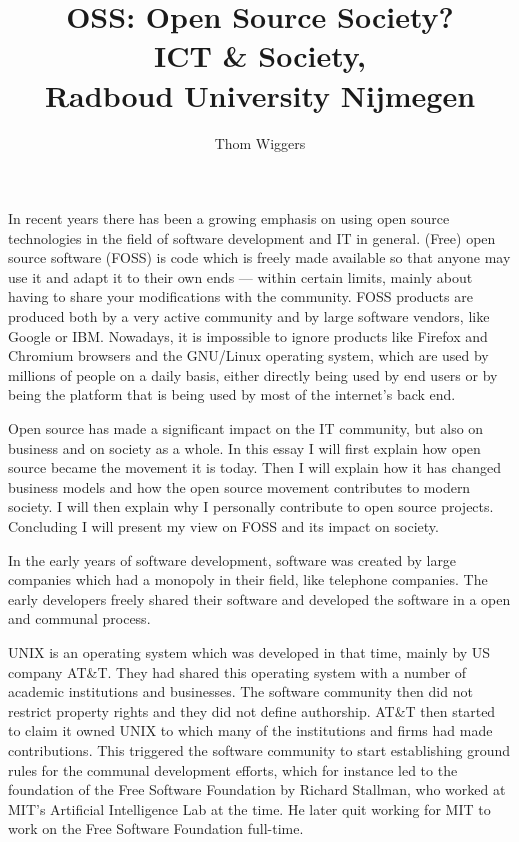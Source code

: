 \documentclass{article}
\author{Thom Wiggers}
\title{\Huge OSS: Open Source Society? \\ \Large ICT \& Society,\\ \large Radboud University Nijmegen}
\begin{document}
\maketitle

In recent years there has been a growing emphasis on using open source
technologies in the field of software development and IT in general. (Free)
open source software (FOSS) is code which is freely made available so that
anyone may use it and adapt it to their own ends --- within certain limits,
mainly about having to share your modifications with the community. FOSS
products are produced both by a very active community and by large software
vendors, like Google or IBM. Nowadays, it is impossible to ignore products like
Firefox and Chromium browsers and the GNU/Linux operating system, which are
used by millions of people on a daily basis, either directly being used by end
users or by being the platform that is being used by most of the internet's
back end.

Open source has made a significant impact on the IT community, but also on
business and on society as a whole. In this essay I will first explain how open
source became the movement it is today. Then I will explain how it has changed
business models and how the open source movement contributes to modern society.
I will then explain why I personally contribute to open source projects. Concluding
I will present my view on FOSS and its impact on society.

In the early years of software development, software was created by large
companies which had a monopoly in their field, like telephone companies. The
early developers freely shared their software and developed the software in
a open and communal process.\cite{kogut01}

UNIX is an operating system which was developed in that time, mainly by US
company AT\&T. They had shared this operating system with a number of academic
institutions and businesses. The software community then did not restrict
property rights and they did not define authorship. AT\&T then started to claim
it owned UNIX to which many of the institutions and firms had made
contributions. This triggered the software community to start establishing
ground rules for the communal development efforts, which for instance led to
the foundation of the Free Software Foundation by Richard Stallman, who worked
at MIT's Artificial Intelligence Lab at the time.\cite{lerner04} He later quit
working for MIT to work on the Free Software Foundation
full-time.\cite{fsfstallman}
\end{document}
